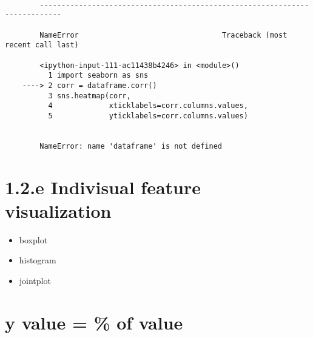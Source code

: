 \documentclass[11pt]{article}
\providecommand{\tightlist}{%
      \setlength{\itemsep}{0pt}\setlength{\parskip}{0pt}}
\begin{document}
    \begin{Verbatim}[commandchars=\\\{\}]

        ---------------------------------------------------------------------------

        NameError                                 Traceback (most recent call last)

        <ipython-input-111-ac11438b4246> in <module>()
          1 import seaborn as sns
    ----> 2 corr = dataframe.corr()
          3 sns.heatmap(corr, 
          4             xticklabels=corr.columns.values,
          5             yticklabels=corr.columns.values)


        NameError: name 'dataframe' is not defined

    \end{Verbatim}

    \section{1.2.e Indivisual feature
visualization}\label{e-indivisual-feature-visualization}

\begin{itemize}
\tightlist
\item
  boxplot
\item
  histogram
\item
  jointplot
\end{itemize}

    \section{y value = \% of value}\label{y-value-of-value}
\end{document}
